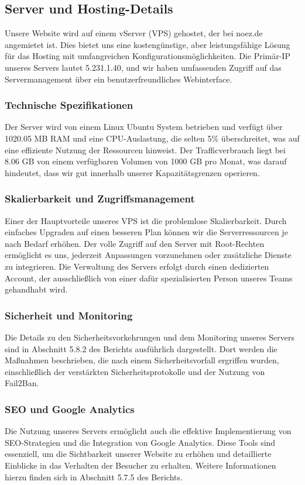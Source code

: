 \subsection{Server und Hosting-Details}
Unsere Website wird auf einem vServer (VPS) gehostet, der bei noez.de angemietet ist. Dies bietet uns eine kostengünstige, aber leistungsfähige Lösung für das Hosting mit umfangreichen Konfigurationsmöglichkeiten. Die Primär-IP unseres Servers lautet 5.231.1.40, und wir haben umfassenden Zugriff auf das Servermanagement über ein benutzerfreundliches Webinterface.

\subsubsection{Technische Spezifikationen}
Der Server wird von einem Linux Ubuntu System betrieben und verfügt über 1020.05 MB RAM und eine CPU-Auslastung, die selten 5\% überschreitet, was auf eine effiziente Nutzung der Ressourcen hinweist. Der Trafficverbrauch liegt bei 8.06 GB von einem verfügbaren Volumen von 1000 GB pro Monat, was darauf hindeutet, dass wir gut innerhalb unserer Kapazitätsgrenzen operieren.

\subsubsection{Skalierbarkeit und Zugriffsmanagement}
Einer der Hauptvorteile unseres VPS ist die problemlose Skalierbarkeit. Durch einfaches Upgraden auf einen besseren Plan können wir die Serverressourcen je nach Bedarf erhöhen. Der volle Zugriff auf den Server mit Root-Rechten ermöglicht es uns, jederzeit Anpassungen vorzunehmen oder zusätzliche Dienste zu integrieren. Die Verwaltung des Servers erfolgt durch einen dedizierten Account, der ausschließlich von einer dafür spezialisierten Person unseres Teams gehandhabt wird.

\subsubsection{Sicherheit und Monitoring}
Die Details zu den Sicherheitsvorkehrungen und dem Monitoring unseres Servers sind in Abschnitt 5.8.2 des Berichts ausführlich dargestellt. Dort werden die Maßnahmen beschrieben, die nach einem Sicherheitsvorfall ergriffen wurden, einschließlich der verstärkten Sicherheitsprotokolle und der Nutzung von Fail2Ban.

\subsubsection{SEO und Google Analytics}
Die Nutzung unseres Servers ermöglicht auch die effektive Implementierung von SEO-Strategien und die Integration von Google Analytics. Diese Tools sind essenziell, um die Sichtbarkeit unserer Website zu erhöhen und detaillierte Einblicke in das Verhalten der Besucher zu erhalten. Weitere Informationen hierzu finden sich in Abschnitt 5.7.5 des Berichts.

